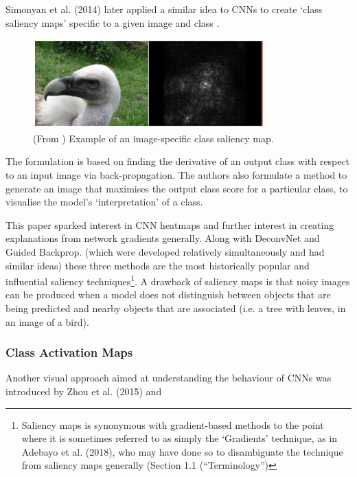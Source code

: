 \documentclass[main]{subfiles}
\begin{document}
Simonyan et al. (2014) later applied a similar idea to CNNs to create `class saliency maps' specific to a given image and class \cite{saliencyII}. 

\begin{figure}[h]
\centering
\includegraphics[scale=0.8]{saliency.png}
\caption{(From \cite{saliencyII}) Example of an image-specific class saliency map.}
\label{tsneimg}
\end{figure}

The formulation is based on finding the derivative of an output class with respect to an input image via back-propagation. The authors also formulate a method to generate an image that maximises the output class score for a particular class, to visualise the model's `interpretation' of a class. 



This paper sparked interest in CNN heatmaps and further interest in creating explanations from network gradients generally. Along with DeconvNet and Guided Backprop. (which were developed relatively simultaneously and had similar ideas) these three methods are the most historically popular and influential saliency techniques\footnote{Saliency maps is synonymous with gradient-based methods to the point where it is  sometimes referred to as simply the `Gradients' technique, as in Adebayo et al. (2018), who may have done so to disambiguate the technique from saliency maps generally (Section 1.1 (``Terminology'')}. A drawback of saliency maps is that noisy images can be produced when a model does not distinguish between objects that are being predicted and nearby objects that are associated (i.e. a tree with leaves, in an image of a bird).

\subsubsection{Class Activation Maps}
Another visual approach aimed at understanding the behaviour of CNNs was introduced by Zhou et al. (2015) and 
\end{document}
